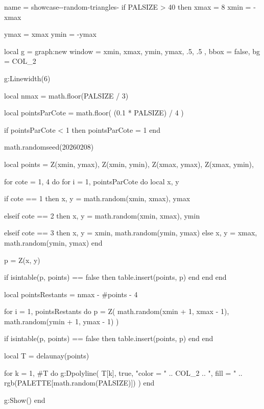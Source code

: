 \begin{luadraw}{name = showcase-\STYLE-random-triangles-\PALETTE}
if PALSIZE > 40 then
  xmax = 8
  xmin = -xmax

  ymax = xmax
  ymin = -ymax

  local g = graph:new{
    window = {
      xmin, xmax,
      ymin, ymax,
      .5, .5
    },
    bbox = false,
    bg   = COL_2
  }

  g:Linewidth(6)

  local nmax = math.floor(PALSIZE / 3)

  local pointsParCote = math.floor(
    (0.1 * PALSIZE) / 4
  )

  if pointsParCote < 1 then
    pointsParCote = 1
  end

  math.randomseed(20260208)

  local points = {
    Z(xmin, ymax),
    Z(xmin, ymin),
    Z(xmax, ymax),
    Z(xmax, ymin),
  }

  for cote = 1, 4 do
    for i = 1, pointsParCote do
      local x, y

      if cote == 1 then
        x, y = math.random(xmin, xmax), ymax

      elseif cote == 2 then
        x, y = math.random(xmin, xmax), ymin

      elseif cote == 3 then
        x, y = xmin, math.random(ymin, ymax)
      else
        x, y = xmax, math.random(ymin, ymax)
      end

      p = Z(x, y)

      if isintable(p, points) == false then
        table.insert(points, p)
      end
    end
  end

  local pointsRestants = nmax - #points - 4

  for i = 1, pointsRestants do
    p = Z(
      math.random(xmin + 1, xmax - 1),
      math.random(ymin + 1, ymax - 1)
    )

    if isintable(p, points) == false then
      table.insert(points, p)
    end
  end

  local T = delaunay(points)

  for k = 1, #T do
    g:Dpolyline(
      T[k],
      true,
         "color = " .. COL_2
      .. ", fill = " .. rgb(PALETTE[math.random(PALSIZE)])
    )
  end

  g:Show()
end
\end{luadraw}



\bigskip\bigskip

